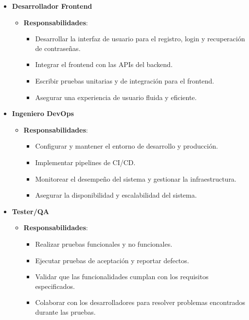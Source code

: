 \documentclass{article}
\begin{document}
\begin{itemize}
    \item \textbf{Desarrollador Frontend}
          \begin{itemize}
              \item \textbf{Responsabilidades}:
                    \begin{itemize}
                        \item Desarrollar la interfaz de usuario para el registro, login y recuperación de contraseñas.
                        \item Integrar el frontend con las APIs del backend.
                        \item Escribir pruebas unitarias y de integración para el frontend.
                        \item Asegurar una experiencia de usuario fluida y eficiente.
                    \end{itemize}
          \end{itemize}

    \item \textbf{Ingeniero DevOps}
          \begin{itemize}
              \item \textbf{Responsabilidades}:
                    \begin{itemize}
                        \item Configurar y mantener el entorno de desarrollo y producción.
                        \item Implementar pipelines de CI/CD.
                        \item Monitorear el desempeño del sistema y gestionar la infraestructura.
                        \item Asegurar la disponibilidad y escalabilidad del sistema.
                    \end{itemize}
          \end{itemize}

    \item \textbf{Tester/QA}
          \begin{itemize}
              \item \textbf{Responsabilidades}:
                    \begin{itemize}
                        \item Realizar pruebas funcionales y no funcionales.
                        \item Ejecutar pruebas de aceptación y reportar defectos.
                        \item Validar que las funcionalidades cumplan con los requisitos especificados.
                        \item Colaborar con los desarrolladores para resolver problemas encontrados durante las pruebas.
                    \end{itemize}
          \end{itemize}
\end{itemize}
\end{document}
